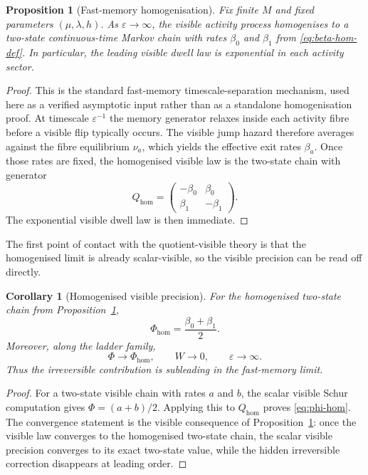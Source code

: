 \documentclass[11pt]{article}
\numberwithin{equation}{section}
\newcommand{\eps}{\varepsilon}
\theoremstyle{thmcompact}
\newtheorem{proposition}[theorem]{Proposition}
\newtheorem{corollary}[theorem]{Corollary}
\theoremstyle{remark}
\begin{document}
\begin{proposition}[Fast-memory homogenisation]\label{prop:fast-memory-homogenisation}
Fix finite $M$ and fixed parameters $(\mu,\lambda,h)$. As $\eps\to\infty$, the visible activity process homogenises to a two-state continuous-time Markov chain with rates $\beta_0$ and $\beta_1$ from \eqref{eq:beta-hom-def}. In particular, the leading visible dwell law is exponential in each activity sector.
\end{proposition}

\begin{proof}
This is the standard fast-memory timescale-separation mechanism, used here as a verified asymptotic input rather than as a standalone homogenisation proof. At timescale $\eps^{-1}$ the memory generator relaxes inside each activity fibre before a visible flip typically occurs. The visible jump hazard therefore averages against the fibre equilibrium $\nu_a$, which yields the effective exit rates $\beta_a$. Once those rates are fixed, the homogenised visible law is the two-state chain with generator
\[
Q_{\mathrm{hom}}=
\begin{pmatrix}
-\beta_0 & \beta_0\\
\beta_1 & -\beta_1
\end{pmatrix}.
\]
The exponential visible dwell law is then immediate.
\end{proof}

The first point of contact with the quotient-visible theory is that the homogenised limit is already scalar-visible, so the visible precision can be read off directly.

\begin{corollary}[Homogenised visible precision]\label{cor:phi-hom}
For the homogenised two-state chain from Proposition~\ref{prop:fast-memory-homogenisation},
\begin{equation}\label{eq:phi-hom}
\Phi_{\mathrm{hom}}=\frac{\beta_0+\beta_1}{2}.
\end{equation}
Moreover, along the ladder family,
\begin{equation}\label{eq:phi-fast-limit}
\Phi\to \Phi_{\mathrm{hom}},
\qquad
W\to 0,
\qquad \eps\to\infty.
\end{equation}
Thus the irreversible contribution is subleading in the fast-memory limit.
\end{corollary}

\begin{proof}
For a two-state visible chain with rates $a$ and $b$, the scalar visible Schur computation gives $\Phi=(a+b)/2$. Applying this to $Q_{\mathrm{hom}}$ proves \eqref{eq:phi-hom}. The convergence statement is the visible consequence of Proposition~\ref{prop:fast-memory-homogenisation}: once the visible law converges to the homogenised two-state chain, the scalar visible precision converges to its exact two-state value, while the hidden irreversible correction disappears at leading order.
\end{proof}
\end{document}
